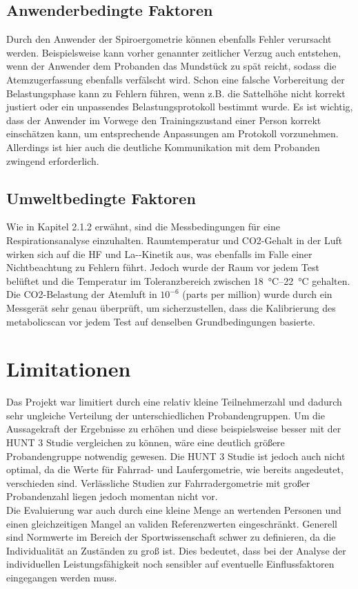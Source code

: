 \subsection{Anwenderbedingte Faktoren}
%
Durch den Anwender der Spiroergometrie können ebenfalls Fehler verursacht werden. Beispielsweise kann vorher genannter zeitlicher Verzug auch entstehen, wenn der Anwender dem Probanden das Mundstück zu spät reicht, sodass die Atemzugerfassung ebenfalls verfälscht wird. Schon eine falsche Vorbereitung der Belastungsphase kann zu Fehlern führen, wenn z.B. die Sattelhöhe nicht korrekt justiert oder ein unpassendes Belastungsprotokoll bestimmt wurde. Es ist wichtig, dass der Anwender im Vorwege den Trainingszustand einer Person korrekt einschätzen kann, um entsprechende Anpassungen am Protokoll vorzunehmen. Allerdings ist hier auch die deutliche Kommunikation mit dem Probanden zwingend erforderlich.
%
\subsection{Umweltbedingte Faktoren}
%
Wie in Kapitel 2.1.2 erwähnt, sind die Messbedingungen für eine Respirationsanalyse einzuhalten. Raumtemperatur und \gls{CO2}-Gehalt in der Luft wirken sich auf die \gls{HF} und \gls{La-}-Kinetik aus, was ebenfalls im Falle einer Nichtbeachtung zu Fehlern führt. Jedoch wurde der Raum vor jedem Test belüftet und die Temperatur im Toleranzbereich zwischen \SIrange{18}{22}{\degreeCelsius} gehalten. Die \gls{CO2}-Belastung der Atemluft in $10^{-6}$ (parts per million) wurde durch ein Messgerät sehr genau überprüft, um sicherzustellen, dass die Kalibrierung des metabolicscan vor jedem Test auf denselben Grundbedingungen basierte.
%
\section{Limitationen}
%
Das Projekt war limitiert durch eine relativ kleine Teilnehmerzahl und dadurch sehr ungleiche Verteilung der unterschiedlichen Probandengruppen. Um die Aussagekraft der Ergebnisse zu erhöhen und diese beispielsweise besser mit der HUNT 3 Studie vergleichen zu können, wäre eine deutlich größere Probandengruppe notwendig gewesen. Die HUNT 3 Studie ist jedoch auch nicht optimal, da die Werte für Fahrrad- und Laufergometrie, wie bereits angedeutet, verschieden sind. Verlässliche Studien zur Fahrradergometrie mit großer Probandenzahl liegen jedoch momentan nicht vor.\\
Die Evaluierung war auch durch eine kleine Menge an wertenden Personen und einen gleichzeitigen Mangel an validen Referenzwerten eingeschränkt. Generell sind Normwerte im Bereich der Sportwissenschaft schwer zu definieren, da die Individualität an Zuständen zu groß ist. Dies bedeutet, dass bei der Analyse der individuellen Leistungsfähigkeit noch sensibler auf eventuelle Einflussfaktoren eingegangen werden muss.
%
